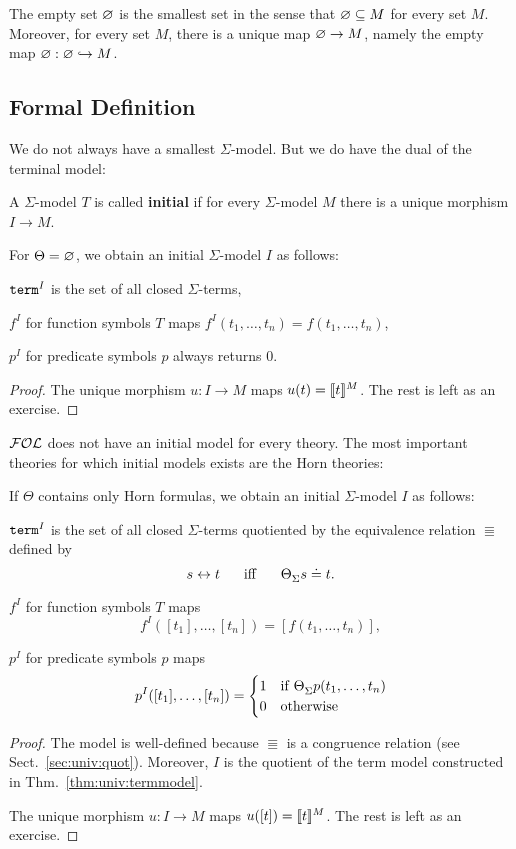 The empty set $\varnothing$ is the smallest set in the sense that $\varnothing\subseteq M$ for every set $M$.
Moreover, for every set $M$, there is a unique map $\varnothing\to M$, namely the empty map $\varnothing:\varnothing\hookrightarrow M$.

\subsection{Formal Definition}

We do not always have a smallest $\Sigma$-model.
But we do have the dual of the terminal model:

\begin{definition}
A $\Sigma$-model $T$ is called \textbf{initial} if for every $\Sigma$-model $M$ there is a unique morphism $I\to M$.
\end{definition}

\begin{theorem}\label{thm:univ:termmodel}
For $\Theta=\varnothing$, we obtain an initial $\Sigma$-model $I$ as follows:
\begin{compactitem}
 \item $\mathtt{term}^I$ is the set of all closed $\Sigma$-terms,
 \item $f^I$ for function symbols $T$ maps $f^I(t_1,\ldots,t_n)=f(t_1,\ldots,t_n)$,
 \item $p^I$ for predicate symbols $p$ always returns $0$.
\end{compactitem}
\end{theorem}
\begin{proof}
The unique morphism $u:I\to M$ maps $u(t)=\llbracket t\rrbracket^{M}$.
The rest is left as an exercise.
\end{proof}

${\mathcal{FOL}}$ does not have an initial model for every theory.
The most important theories for which initial models exists are the Horn theories:

\begin{theorem}\label{thm:univ:termmodel2}
If $\Theta$ contains only Horn formulas, we obtain an initial $\Sigma$-model $I$ as follows:
\begin{compactitem}
 \item $\mathtt{term}^I$ is the set of all closed $\Sigma$-terms quotiented by the equivalence relation $\Equiv$ defined by
   \[s\Equiv t  \tb\miff\tb \iscons{\Sigma}{}{\Theta}{s\doteq t}.\]
 \item $f^I$ for function symbols $T$ maps \[f^I([t_1],\ldots,[t_n])=[f(t_1,\ldots,t_n)],\]
 \item $p^I$ for predicate symbols $p$ maps \[p^I([t_1],\ldots,[t_n])=\cas{1\mifc \iscons{\Sigma}{}{\Theta}{p(t_1,\ldots,t_n)}\\0\mothw}\]
\end{compactitem}
\end{theorem}
\begin{proof}
The model is well-defined because $\Equiv$ is a congruence relation (see Sect.~\ref{sec:univ:quot}).
Moreover, $I$ is the quotient of the term model constructed in Thm.~\ref{thm:univ:termmodel}.

The unique morphism $u:I\to M$ maps $u([t])=\llbracket t\rrbracket^{M}$.
The rest is left as an exercise.
\end{proof}

